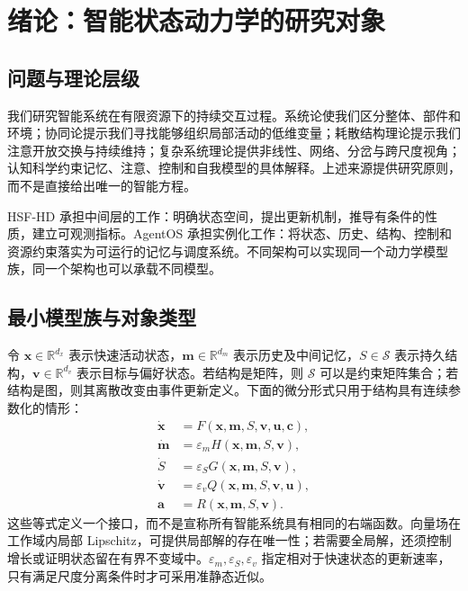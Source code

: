 \chapter*{绪论：智能状态动力学的研究对象}
\label{intro:scope}

\section*{问题与理论层级}
我们研究智能系统在有限资源下的持续交互过程。系统论使我们区分整体、部件和环境；协同论提示我们寻找能够组织局部活动的低维变量；耗散结构理论提示我们注意开放交换与持续维持；复杂系统理论提供非线性、网络、分岔与跨尺度视角；认知科学约束记忆、注意、控制和自我模型的具体解释。上述来源提供研究原则，而不是直接给出唯一的智能方程。

HSF-HD 承担中间层的工作：明确状态空间，提出更新机制，推导有条件的性质，建立可观测指标。AgentOS 承担实例化工作：将状态、历史、结构、控制和资源约束落实为可运行的记忆与调度系统。不同架构可以实现同一个动力学模型族，同一个架构也可以承载不同模型。

\section*{最小模型族与对象类型}
令 $\mathbf{x}\in\mathbb{R}^{d_x}$ 表示快速活动状态，$\mathbf{m}\in\mathbb{R}^{d_m}$ 表示历史及中间记忆，$S\in\mathcal{S}$ 表示持久结构，$\mathbf{v}\in\mathbb{R}^{d_v}$ 表示目标与偏好状态。若结构是矩阵，则 $\mathcal{S}$ 可以是约束矩阵集合；若结构是图，则其离散改变由事件更新定义。下面的微分形式只用于结构具有连续参数化的情形：
\begin{align}
\dot{\mathbf{x}}&=F(\mathbf{x},\mathbf{m},S,\mathbf{v},\mathbf{u},\mathbf{c}),\\
\dot{\mathbf{m}}&=\varepsilon_m H(\mathbf{x},\mathbf{m},S,\mathbf{v}),\\
\dot{S}&=\varepsilon_S G(\mathbf{x},\mathbf{m},S,\mathbf{v}),\\
\dot{\mathbf{v}}&=\varepsilon_v Q(\mathbf{x},\mathbf{m},S,\mathbf{v},\mathbf{u}),\\
\mathbf{a}&=R(\mathbf{x},\mathbf{m},S,\mathbf{v}).
\end{align}
这些等式定义一个接口，而不是宣称所有智能系统具有相同的右端函数。向量场在工作域内局部 Lipschitz，可提供局部解的存在唯一性；若需要全局解，还须控制增长或证明状态留在有界不变域中。$\varepsilon_m,\varepsilon_S,\varepsilon_v$ 指定相对于快速状态的更新速率，只有满足尺度分离条件时才可采用准静态近似。


